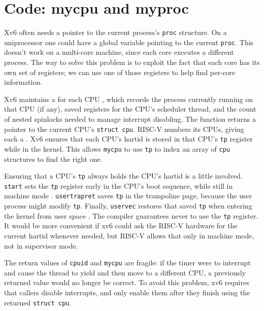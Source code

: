 \section{Code: mycpu and myproc}

Xv6 often needs a pointer to the current process's \lstinline{proc}
structure. On a uniprocessor one could have a global variable pointing
to the current \lstinline{proc}. This doesn't work on a multi-core
machine, since each core executes a different process. The way to
solve this problem is to exploit the fact that each core has its own
set of registers; we can use one of those registers to help find
per-core information.

Xv6 maintains a
for each CPU
,
which records
the process currently running
on that CPU (if any),
saved registers for the CPU's scheduler thread,
and the count of nested spinlocks needed to manage
interrupt disabling.
The function
returns a pointer to the current CPU's
\lstinline{struct cpu}.
RISC-V numbers its CPUs, giving each
a .
Xv6 ensures that each CPU's hartid is stored in that CPU's \lstinline{tp} register
while in the kernel.
This allows
\lstinline{mycpu} to use \lstinline{tp} to index an array
of \lstinline{cpu} structures to find the right one.

Ensuring that a CPU's \lstinline{tp} always holds the CPU's
hartid is a little involved. \lstinline{start} sets the \lstinline{tp}
register early in the CPU's boot sequence, while still in machine mode
.
\lstinline{usertrapret} saves \lstinline{tp} in the trampoline
page, because the user process might modify \lstinline{tp}.
Finally, \lstinline{uservec} restores that saved \lstinline{tp}
when entering the kernel from user space
.
The compiler guarantees never to use the \lstinline{tp}
register.
It would be more convenient if xv6 could ask the RISC-V
hardware for the current hartid whenever needed,
but RISC-V allows that only in
machine mode, not in supervisor mode.

The return values of
\lstinline{cpuid}
and
\lstinline{mycpu}
are fragile: if the timer were to interrupt and cause
the thread to yield and then move to a different CPU,
a previously returned value would no longer be correct.
To avoid this problem, xv6 requires that callers 
disable interrupts, and only enable
them after they finish using the returned
\lstinline{struct cpu}.

